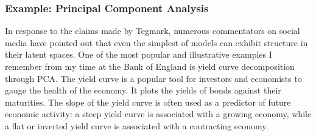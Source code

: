 \documentclass{article}
\theoremstyle{plain}
\theoremstyle{definition}
\theoremstyle{remark}
\begin{document}
\subsubsection{Example: Principal Component
Analysis}\label{example-principal-component-analysis}

In response to the claims made by Tegmark, numerous commentators on
social media have pointed out that even the simplest of models can
exhibit structure in their latent spaces. One of the most popular and
illustrative examples I remember from my time at the Bank of England is
yield curve decomposition through PCA. The yield curve is a popular tool
for investors and economists to gauge the health of the economy. It
plots the yields of bonds against their maturities. The slope of the
yield curve is often used as a predictor of future economic activity: a
steep yield curve is associated with a growing economy, while a flat or
inverted yield curve is associated with a contracting economy.


\end{document}
